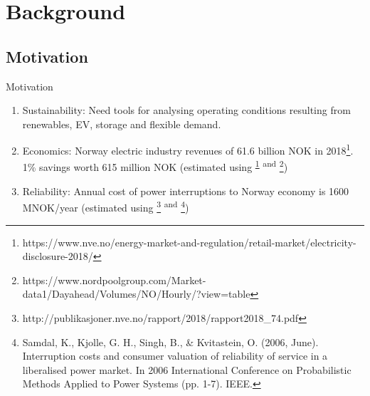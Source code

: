 \documentclass[aspectratio=169]{beamer}
\begin{document}




	\section{Background}
	\subsection{Motivation}
	\begin{frame}{Motivation}
		\begin{enumerate}
  			\item<1-> \vskip -1cm Sustainability: {\footnotesize Need tools for analysing operating conditions resulting from renewables, EV, storage and flexible demand.}
			\item<2-> Economics: {\footnotesize Norway electric industry revenues of 61.6 billion NOK in 2018\footnote{\label{note1} \tiny https://www.nve.no/energy-market-and-regulation/retail-market/electricity-disclosure-2018/}. 1\% savings worth 615 million NOK (estimated using \textsuperscript{\ref{note1}} \textsuperscript{and} \footnote{\tiny{https://www.nordpoolgroup.com/Market-data1/Dayahead/Volumes/NO/Hourly/?view=table}})} 


			\item<3-> Reliability: {\footnotesize Annual cost of power interruptions to Norway economy is 1600 MNOK/year (estimated using \footnote{\tiny http://publikasjoner.nve.no/rapport/2018/rapport2018\_74.pdf} \textsuperscript{and} \footnote{\tiny Samdal, K., Kjolle, G. H., Singh, B., \& Kvitastein, O. (2006, June). Interruption costs and consumer valuation of reliability of service in a liberalised power market. In 2006 International Conference on Probabilistic Methods Applied to Power Systems (pp. 1-7). IEEE.})   }
			

    
	\end{enumerate}
		\end{frame}	
\end{document}
